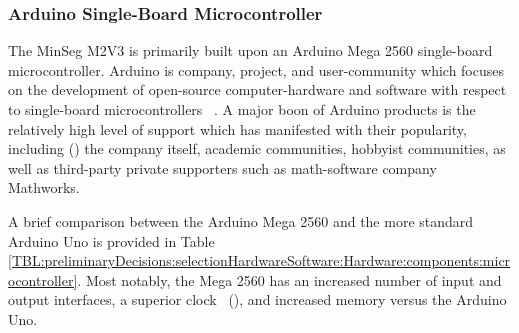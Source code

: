 \documentclass[crop=false,float=true,class=scrreprt]{standalone}
\begin{document}
\subsubsection{Arduino Single-Board Microcontroller}
\label{SEC:preliminaryDecisions:selectionHardwareSoftware:hardware:components:microcontroller}

The MinSeg M2V3 is primarily built upon an Arduino Mega 2560 single-board microcontroller.  Arduino is company, project, and user-community which focuses on the development of open-source computer-hardware and software with respect to single-board microcontrollers~%
\cite{REF:online:wikipedia:arduino}.
A major boon of Arduino products is the relatively high level of support
which has manifested with their popularity, including 
{\fns()}
the company itself, academic communities, hobbyist communities, 
as well as third-party private supporters such as math-software company Mathworks.

A brief comparison between the Arduino Mega 2560 and the more standard Arduino Uno is provided in Table~%
\ref{TBL:preliminaryDecisions:selectionHardwareSoftware:Hardware:components:microcontroller}.
Most notably, the Mega 2560 has 
an increased number of input and output interfaces, 
a superior clock~%
\cite{REF:online:arduino:clock}
{\fns()}, 
and increased memory 
versus the Arduino Uno.
\end{document}
